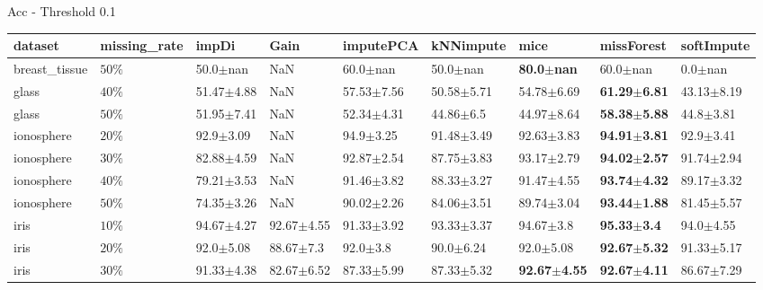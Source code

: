  Acc - Threshold 0.1 
 \begin{tabular}{lllllllll}
\toprule
      dataset & missing_rate &                   impDi &            Gain &               imputePCA &               kNNimpute &                    mice &              missForest &              softImpute \\
\midrule
breast_tissue &     $ 50\% $ &            50.0$\pm$nan &             NaN &            60.0$\pm$nan &            50.0$\pm$nan &   \textbf{80.0$\pm$nan} &            60.0$\pm$nan &             0.0$\pm$nan \\
        glass &     $ 40\% $ &          51.47$\pm$4.88 &             NaN &          57.53$\pm$7.56 &          50.58$\pm$5.71 &          54.78$\pm$6.69 & \textbf{61.29$\pm$6.81} &          43.13$\pm$8.19 \\
        glass &     $ 50\% $ &          51.95$\pm$7.41 &             NaN &          52.34$\pm$4.31 &           44.86$\pm$6.5 &          44.97$\pm$8.64 & \textbf{58.38$\pm$5.88} &           44.8$\pm$3.81 \\
   ionosphere &     $ 20\% $ &           92.9$\pm$3.09 &             NaN &           94.9$\pm$3.25 &          91.48$\pm$3.49 &          92.63$\pm$3.83 & \textbf{94.91$\pm$3.81} &           92.9$\pm$3.41 \\
   ionosphere &     $ 30\% $ &          82.88$\pm$4.59 &             NaN &          92.87$\pm$2.54 &          87.75$\pm$3.83 &          93.17$\pm$2.79 & \textbf{94.02$\pm$2.57} &          91.74$\pm$2.94 \\
   ionosphere &     $ 40\% $ &          79.21$\pm$3.53 &             NaN &          91.46$\pm$3.82 &          88.33$\pm$3.27 &          91.47$\pm$4.55 & \textbf{93.74$\pm$4.32} &          89.17$\pm$3.32 \\
   ionosphere &     $ 50\% $ &          74.35$\pm$3.26 &             NaN &          90.02$\pm$2.26 &          84.06$\pm$3.51 &          89.74$\pm$3.04 & \textbf{93.44$\pm$1.88} &          81.45$\pm$5.57 \\
         iris &     $ 10\% $ &          94.67$\pm$4.27 &  92.67$\pm$4.55 &          91.33$\pm$3.92 &          93.33$\pm$3.37 &           94.67$\pm$3.8 &  \textbf{95.33$\pm$3.4} &           94.0$\pm$4.55 \\
         iris &     $ 20\% $ &           92.0$\pm$5.08 &   88.67$\pm$7.3 &            92.0$\pm$3.8 &           90.0$\pm$6.24 &           92.0$\pm$5.08 & \textbf{92.67$\pm$5.32} &          91.33$\pm$5.17 \\
         iris &     $ 30\% $ &          91.33$\pm$4.38 &  82.67$\pm$6.52 &          87.33$\pm$5.99 &          87.33$\pm$5.32 & \textbf{92.67$\pm$4.55} & \textbf{92.67$\pm$4.11} &          86.67$\pm$7.29 \\

\end{tabular}
